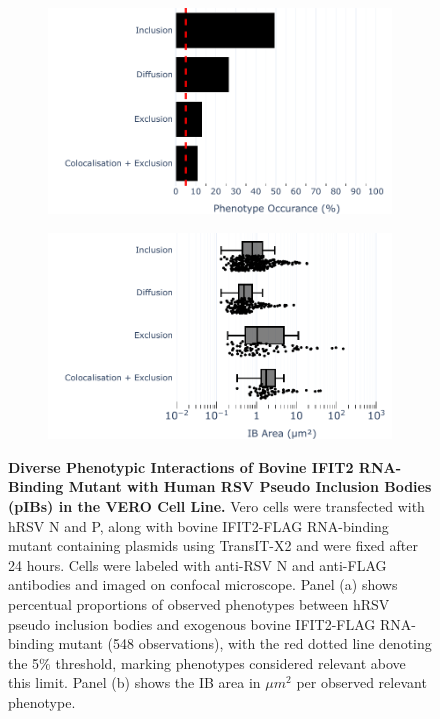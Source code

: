 \begin{figure}
    \begin{subfigure}{0.495\textwidth}
        \caption{}
        \includegraphics[width=1\linewidth]{08. Chapter 3/Figs/03. pIB/03. IFIT2/05. IFIT2-RNA binding mutant/02. pIB/01. bar_bi2f24_hnhp.pdf} 
    \end{subfigure}
    \begin{subfigure}{0.495\textwidth}
        \caption{}
        \includegraphics[width=1\linewidth]{08. Chapter 3/Figs/03. pIB/03. IFIT2/05. IFIT2-RNA binding mutant/02. pIB/02. box_bi2f24_hnhp.pdf}
    \end{subfigure}
    \caption[Diverse Phenotypic Interactions of Bovine IFIT2 RNA-Binding Mutant with Human RSV Pseudo Inclusion Bodies (pIBs) in the VERO Cell Line.]{\textbf{Diverse Phenotypic Interactions of Bovine IFIT2 RNA-Binding Mutant with Human RSV Pseudo Inclusion Bodies (pIBs) in the VERO Cell Line.} Vero cells were transfected with hRSV N and P, along with bovine IFIT2-FLAG RNA-binding mutant containing plasmids using TransIT-X2 and were fixed after 24 hours. Cells were labeled with anti-RSV N and anti-FLAG antibodies and imaged on confocal microscope. Panel (a) shows percentual proportions of observed phenotypes between hRSV pseudo inclusion bodies and exogenous bovine IFIT2-FLAG RNA-binding mutant (548 observations), with the red dotted line denoting the 5\% threshold, marking phenotypes considered relevant above this limit. Panel (b) shows the IB area in \(\mu m^2\) per observed relevant phenotype.}
    \label{fig:Diverse Phenotypic Interactions of Bovine IFIT2 RNA-Binding Mutant with Human RSV Pseudo Inclusion Bodies (pIBs) in the VERO Cell Line}
\end{figure}

